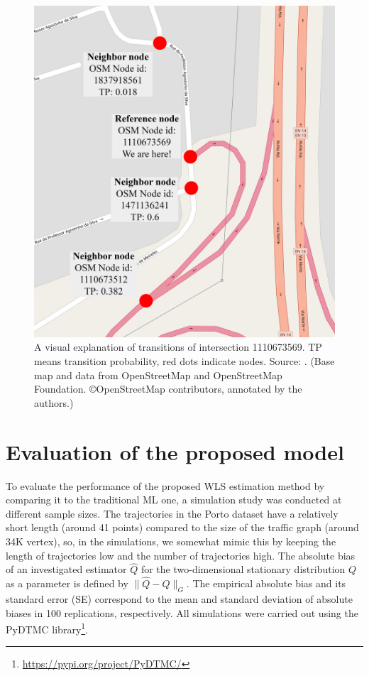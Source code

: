 \documentclass[b5paper,12pt]{report}
\theoremstyle{definition}
\begin{document}
\begin{figure}[!t]
    \centering
    \includegraphics[width=.65\textwidth]{img/map_example_new.jpg}
    \caption{A visual explanation of transitions of intersection 1110673569. TP means transition probability, red dots indicate nodes. Source: \cite{traffic-paper}. (Base map and data from OpenStreetMap and OpenStreetMap Foundation. \copyright OpenStreetMap contributors, annotated by the authors.)}
    \label{mapexample}
\end{figure}

\section{Evaluation of the proposed model}
\label{evaluation}

To evaluate the performance of the proposed WLS estimation method by comparing it to the traditional ML one, a simulation study was conducted at different sample sizes. The trajectories in the Porto dataset have a relatively short length (around 41 points) compared to the size of the traffic graph (around 34K vertex), so, in the simulations, we somewhat mimic this by keeping the length of trajectories low and the number of trajectories high. The absolute bias of an investigated estimator $\widehat{Q}$ for the two-dimensional stationary distribution $Q$ as a parameter is defined by $\|\widehat{Q} -Q\|_G$. The empirical absolute bias and its standard error (SE) correspond to the mean and standard deviation of absolute biases in 100 replications, respectively. All simulations were carried out using the PyDTMC library\footnote{\url{https://pypi.org/project/PyDTMC/}}.
\end{document}
